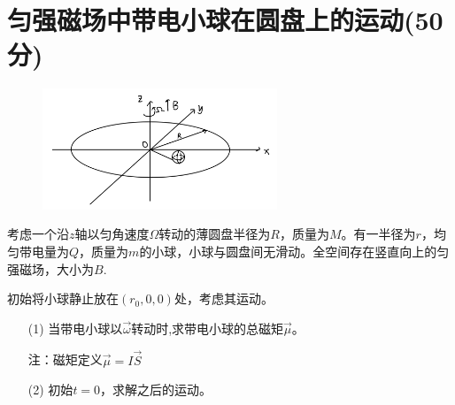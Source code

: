 \documentclass{article}
\begin{document}
\section*{匀强磁场中带电小球在圆盘上的运动(50分)}
\begin{figure}
	\vspace{-15pt}    %
	\includegraphics[width=7cm]{img/0002.1.jpeg}\\
	\vspace{-15pt}    %
	\caption{}
	\vspace{-15pt}    %
\end{figure}
考虑一个沿$z$轴以匀角速度$\Omega$转动的薄圆盘半径为$R$，质量为$M$。有一半径为$r$，均匀带电量为$Q$，质量为$m$的小球，小球与圆盘间无滑动。全空间存在竖直向上的匀强磁场，大小为$B$.\par
初始将小球静止放在$(r_0,0,0)$处，考虑其运动。\par
\begin{itemize}
\item[(1)]当带电小球以$\vec{\omega}$转动时,求带电小球的总磁矩$\vec{\mu}$。\par
注：磁矩定义$\vec{\mu}=I\vec{S}$\par
\item[(2)]初始$t=0$，求解之后的运动。
\end{itemize}
\end{document}
